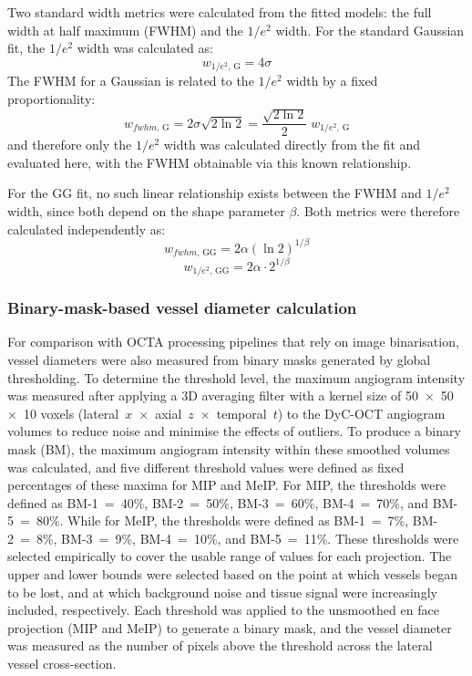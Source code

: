 Two standard width metrics were calculated from the fitted models: the full width at half maximum (FWHM) and the $1/e^2$ width. For the standard Gaussian fit, the $1/e^2$ width was calculated as:
\begin{equation}
\label{eq:gauss_1e2}
w_{1/e^2,\,\mathrm{G}} = 4\sigma
\end{equation}
The FWHM for a Gaussian is related to the $1/e^2$ width by a fixed proportionality:
\begin{equation}
\label{eq:gauss_fwhm}
w_{fwhm,\,\mathrm{G}} = 2\sigma\sqrt{2\ln 2} = \frac{\sqrt{2\ln 2}}{2} \; w_{1/e^2,\,\mathrm{G}}
\end{equation}
and therefore only the $1/e^2$ width was calculated directly from the fit and evaluated here, with the FWHM obtainable via this known relationship.

For the GG fit, no such linear relationship exists between the FWHM and $1/e^2$ width, since both depend on the shape parameter $\beta$. Both metrics were therefore calculated independently as:
\begin{equation}
\label{eq:gg_fwhm}
w_{fwhm,\,\mathrm{GG}} = 2\alpha{\left(\ln 2\right)}^{1/\beta}
\end{equation}
\begin{equation}
\label{eq:gg_1e2}
w_{1/e^2,\,\mathrm{GG}} = 2\alpha \cdot 2^{1/\beta}
\end{equation}

\subsubsection{Binary-mask-based vessel diameter calculation}
\label{subsubsec:binary_mask}
For comparison with OCTA processing pipelines that rely on image binarisation, vessel diameters were also measured from binary masks generated by global thresholding. To determine the threshold level, the maximum angiogram intensity was measured after applying a 3D averaging filter with a kernel size of 50~$\times$~50~$\times$~10 voxels (lateral~$x$~$\times$~axial~$z$~$\times$~temporal~$t$) to the DyC-OCT angiogram volumes to reduce noise and minimise the effects of outliers. To produce a binary mask (BM), the maximum angiogram intensity within these smoothed volumes was calculated, and five different threshold values were defined as fixed percentages of these maxima for MIP and MeIP. For MIP, the thresholds were defined as BM-1~=~40\%, BM-2~=~50\%, BM-3~=~60\%, BM-4~=~70\%, and BM-5~=~80\%. While for MeIP, the thresholds were defined as BM-1~=~7\%, BM-2~=~8\%, BM-3~=~9\%, BM-4~=~10\%, and BM-5~=~11\%. These thresholds were selected empirically to cover the usable range of values for each projection. The upper and lower bounds were selected based on the point at which vessels began to be lost, and at which background noise and tissue signal were increasingly included, respectively. Each threshold was applied to the unsmoothed en face projection (MIP and MeIP) to generate a binary mask, and the vessel diameter was measured as the number of pixels above the threshold across the lateral vessel cross-section.

